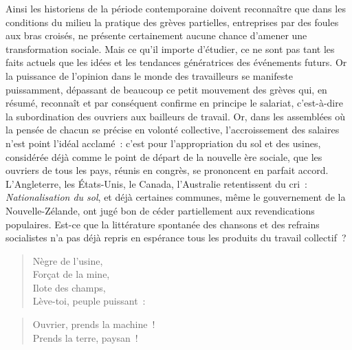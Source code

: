 \documentclass[french,twoside]{book} %
\newenvironment{quoteblock}%
  {\begin{quoting}}
  {\end{quoting}}
\newenvironment{quotebar}{%
    \def\FrameCommand{{\color{rubric!10!}\vrule width 0.5em} \hspace{0.9em}}%
    \def\OuterFrameSep{\itemsep} %
    \MakeFramed {\advance\hsize-\width \FrameRestore}
  }%
  {%
    \endMakeFramed
  }
\renewenvironment{quoteblock}%
  {%
    \savenotes
    \setstretch{0.9}
    \normalfont
    \begin{quotebar}
  }
  {%
    \end{quotebar}
    \spewnotes
  }
\begin{document}
Ainsi les historiens de la période contemporaine doivent reconnaître que dans les conditions du milieu la pratique des  grèves partielles, entreprises par des foules aux bras croisés, ne présente certainement aucune chance d’amener une transformation sociale. Mais ce qu’il importe d’étudier, ce ne sont pas tant les faits actuels que les idées et les tendances génératrices des événements futurs. Or la puissance de l’opinion dans le monde des travailleurs se manifeste puissamment, dépassant de beaucoup ce petit mouvement des grèves qui, en résumé, reconnaît et par conséquent confirme en principe le salariat, c’est-à-dire la subordination des ouvriers aux bailleurs de travail. Or, dans les assemblées où la pensée de chacun se précise en volonté collective, l’accroissement des salaires n’est point l’idéal acclamé : c’est pour l’appropriation du sol et des  usines, considérée déjà comme le point de départ de la nouvelle ère sociale, que les ouvriers de tous les pays, réunis en congrès, se prononcent en parfait accord. L’Angleterre, les États-Unis, le Canada, l’Australie retentissent du cri : \emph{Nationalisation du sol}, et déjà certaines communes, même le gouvernement de la Nouvelle-Zélande, ont jugé bon de céder partiellement aux revendications populaires. Est-ce que la littérature spontanée des chansons et des refrains socialistes n’a pas déjà repris en espérance tous les produits du travail collectif ?\par


\begin{verse}
Nègre de l’usine,\\
Forçat de la mine,\\
Ilote des champs,\\
Lève-toi, peuple puissant :\\
\end{verse}
\begin{quoteblock}
 \end{quoteblock}

\begin{verse}
Ouvrier, prends la machine !\\
Prends la terre, paysan !\\
\end{verse}
\end{document}
